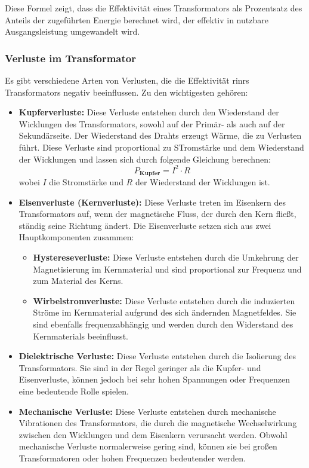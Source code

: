 	Diese Formel zeigt, dass die Effektivität eines Transformators als Prozentsatz des Anteils der zugeführten Energie berechnet wird, der effektiv in nutzbare Ausgangsleistung umgewandelt wird.
	
	\subsubsection{Verluste im Transformator}
	Es gibt verschiedene Arten von Verlusten, die die Effektivität rinrs Transformators negativ beeinflussen. Zu den wichtigesten gehören:
	\begin{itemize}
		\item \textbf{Kupferverluste:} Diese Verluste entstehen durch den Wiederstand der Wicklungen des Transformators, sowohl auf der Primär- als auch auf der Sekundärseite. Der Wiederstand des Drahts erzeugt Wärme, die zu Verlusten führt. Diese Verluste sind proportional zu STromstärke und dem Wiederstand der Wicklungen und lassen sich durch folgende Gleichung berechnen:
		\[P_{\textbf{Kupfer}} = I^2 \cdot R\] wobei \(I\) die Stromstärke und \(R\) der Wiederstand der Wicklungen ist.
		
		\item \textbf{Eisenverluste (Kernverluste):} Diese Verluste treten im Eisenkern des Transformators auf, wenn der magnetische Fluss, der durch den Kern flie{\ss}t, ständig seine Richtung ändert. Die Eisenverluste setzen sich aus zwei Hauptkomponenten zusammen:
		\begin{itemize}
			\item \textbf{Hystereseverluste:} Diese Verluste entstehen durch die Umkehrung der Magnetisierung im Kernmaterial und sind proportional zur Frequenz und zum Material des Kerns.
			\item \textbf{Wirbelstromverluste:} Diese Verluste entstehen durch die induzierten Ströme im Kernmaterial aufgrund des sich ändernden Magnetfeldes. Sie sind ebenfalls frequenzabhängig und werden durch den Widerstand des Kernmaterials beeinflusst.
		\end{itemize}
		
		\item \textbf{Dielektrische Verluste:} Diese Verluste entstehen durch die Isolierung des Transformators. Sie sind in der Regel geringer als die Kupfer- und Eisenverluste, können jedoch bei sehr hohen Spannungen oder Frequenzen eine bedeutende Rolle spielen.
		
		\item \textbf{Mechanische Verluste:} Diese Verluste entstehen durch mechanische Vibrationen des Transformators, die durch die magnetische Wechselwirkung zwischen den Wicklungen und dem Eisenkern verursacht werden. Obwohl mechanische Verluste normalerweise gering sind, können sie bei gro{\ss}en Transformatoren oder hohen Frequenzen bedeutender werden.
	\end{itemize}
	

